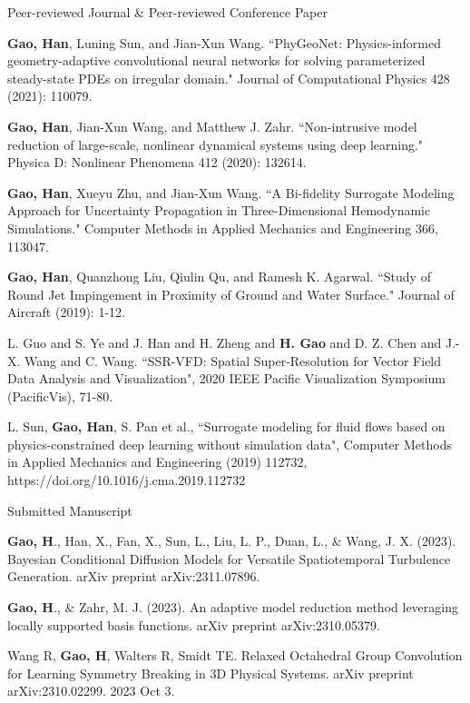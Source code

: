 \documentclass{resume} %
\begin{document}
\begin{rSection}{Peer-reviewed Journal \& Peer-reviewed Conference Paper}
\item \textbf{Gao, Han}, Luning Sun, and Jian-Xun Wang. ``PhyGeoNet: Physics-informed geometry-adaptive convolutional neural networks for solving parameterized steady-state PDEs on irregular domain." Journal of Computational Physics 428 (2021): 110079.

\item \textbf{Gao, Han}, Jian-Xun Wang, and Matthew J. Zahr. ``Non-intrusive model reduction of large-scale, nonlinear dynamical systems using deep learning." Physica D: Nonlinear Phenomena 412 (2020): 132614.\\

\item \textbf{Gao, Han}, Xueyu Zhu, and Jian-Xun Wang. ``A Bi-fidelity Surrogate Modeling Approach for Uncertainty Propagation in Three-Dimensional Hemodynamic Simulations." Computer Methods in Applied Mechanics and Engineering 366, 113047.\\

\item \textbf{Gao, Han}, Quanzhong Liu, Qiulin Qu, and Ramesh K. Agarwal. ``Study of Round Jet Impingement in Proximity of Ground and Water Surface." Journal of Aircraft (2019): 1-12.\\

\item L. Guo and S. Ye and J. Han and H. Zheng and \textbf{H. Gao} and D. Z. Chen and J.-X. Wang and C. Wang. ``{SSR-VFD}: Spatial Super-Resolution for Vector Field Data Analysis and Visualization", 2020 IEEE Pacific Visualization Symposium (PacificVis), 71-80.\\

\item  L. Sun, \textbf{Gao, Han}, S. Pan et al., ``Surrogate modeling for fluid flows based on physics-constrained deep learning without simulation data", Computer Methods in Applied Mechanics and Engineering (2019) 112732, https://doi.org/10.1016/j.cma.2019.112732
\end{rSection}

\begin{rSection}{Submitted Manuscript} 

\item \textbf{Gao, H}., Han, X., Fan, X., Sun, L., Liu, L. P., Duan, L., \& Wang, J. X. (2023). Bayesian Conditional Diffusion Models for Versatile Spatiotemporal Turbulence Generation. arXiv preprint arXiv:2311.07896.

\item \textbf{Gao, H}., \& Zahr, M. J. (2023). An adaptive model reduction method leveraging locally supported basis functions. arXiv preprint arXiv:2310.05379.

\item Wang R, \textbf{Gao, H}, Walters R, Smidt TE. Relaxed Octahedral Group Convolution for Learning Symmetry Breaking in 3D Physical Systems. arXiv preprint arXiv:2310.02299. 2023 Oct 3.
\end{rSection}
\end{document}
